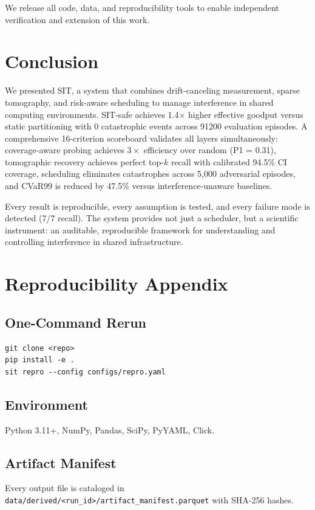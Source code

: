 \documentclass[11pt,twocolumn]{article}
\begin{document}
We release all code, data, and reproducibility tools to enable
independent verification and extension of this work.

\section{Conclusion}

We presented SIT, a system that combines drift-canceling measurement,
sparse tomography, and risk-aware scheduling to manage interference
in shared computing environments. SIT-safe achieves 1.4$\times$ higher
effective goodput versus static partitioning with 0 catastrophic
events across 91200 evaluation episodes. A comprehensive
16-criterion scoreboard validates all layers simultaneously:
coverage-aware probing achieves $3\times$ efficiency over random
(P1 = 0.31), tomographic recovery achieves perfect top-$k$ recall
with calibrated 94.5\% CI coverage, scheduling eliminates catastrophes
across 5,000 adversarial episodes, and CVaR99 is reduced by 47.5\%
versus interference-unaware baselines.

Every result is reproducible, every assumption
is tested, and every failure mode is detected (7/7 recall).
The system provides not just a scheduler, but a scientific instrument:
an auditable, reproducible framework for understanding and controlling
interference in shared infrastructure.

\appendix

\section{Reproducibility Appendix}

\subsection{One-Command Rerun}
\begin{verbatim}
git clone <repo>
pip install -e .
sit repro --config configs/repro.yaml
\end{verbatim}

\subsection{Environment}
Python 3.11+, NumPy, Pandas, SciPy, PyYAML, Click.

\subsection{Artifact Manifest}
Every output file is cataloged in
\texttt{data/derived/<run\_id>/artifact\_manifest.parquet}
with SHA-256 hashes.
\end{document}
